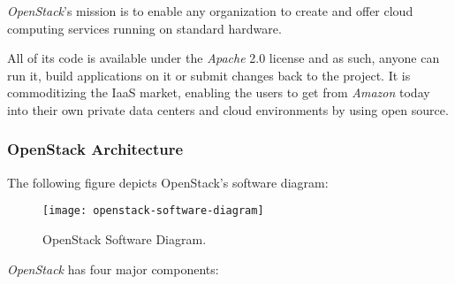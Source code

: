 \textit{OpenStack}'s mission is to enable any organization to create and offer cloud computing services running on standard hardware.

All of its code is available under the \textit{Apache} 2.0 license and as such, anyone can run it, build applications on it or submit changes back to the project. It is commoditizing the IaaS market, enabling the users to get from \textit{Amazon} today into their own private data centers and cloud environments by using open source. \cite{https://github.com/dellcloudedge/crowbar/wiki/OpenStack-Essex-Deploy-Day}

\subsubsection*{OpenStack Architecture}\label{subsubsec:openstack_arch}
  
The following figure depicts OpenStack's software diagram:

\begin{figure}[h]
  \begin{center}
    \leavevmode
    \texttt{[image: openstack-software-diagram]}
    \caption{OpenStack Software Diagram\cite{openstack}.}
    \label{fig:openstack_sw_diag}
  \end{center}
\end{figure}

\textit{OpenStack} has four major components:

